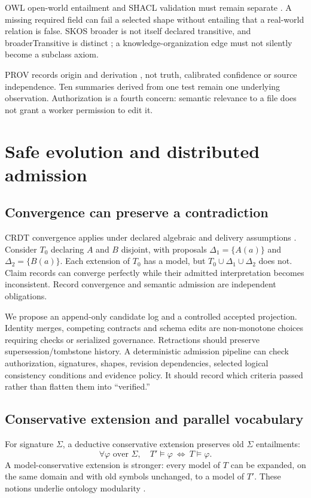 \documentclass[11pt]{article}
\begin{document}
OWL open-world entailment and SHACL validation must remain separate \citep{semantics2012,shacl2017}. A missing required field can fail a selected shape without entailing that a real-world relation is false. SKOS broader is not itself declared transitive, and broaderTransitive is distinct \citep{skos2009}; a knowledge-organization edge must not silently become a subclass axiom.

PROV records origin and derivation \citep{prov2013}, not truth, calibrated confidence or source independence. Ten summaries derived from one test remain one underlying observation. Authorization is a fourth concern: semantic relevance to a file does not grant a worker permission to edit it.

\section{Safe evolution and distributed admission}
\subsection{Convergence can preserve a contradiction}
CRDT convergence applies under declared algebraic and delivery assumptions \citep{crdt2011}. Consider $T_0$ declaring $A$ and $B$ disjoint, with proposals $\Delta_1=\{A(a)\}$ and $\Delta_2=\{B(a)\}$. Each extension of $T_0$ has a model, but $T_0\cup\Delta_1\cup\Delta_2$ does not. Claim records can converge perfectly while their admitted interpretation becomes inconsistent. Record convergence and semantic admission are independent obligations.

We propose an append-only candidate log and a controlled accepted projection. Identity merges, competing contracts and schema edits are non-monotone choices requiring checks or serialized governance. Retractions should preserve supersession/tombstone history. A deterministic admission pipeline can check authorization, signatures, shapes, revision dependencies, selected logical consistency conditions and evidence policy. It should record which criteria passed rather than flatten them into ``verified.''

\subsection{Conservative extension and parallel vocabulary}
For signature $\Sigma$, a deductive conservative extension preserves old $\Sigma$ entailments:
\begin{equation}
\forall\varphi\text{ over }\Sigma,\quad T'\models\varphi\ \Longleftrightarrow\ T\models\varphi.
\end{equation}
A model-conservative extension is stronger: every model of $T$ can be expanded, on the same domain and with old symbols unchanged, to a model of $T'$. These notions underlie ontology modularity \citep{modularity2008}.
\end{document}
